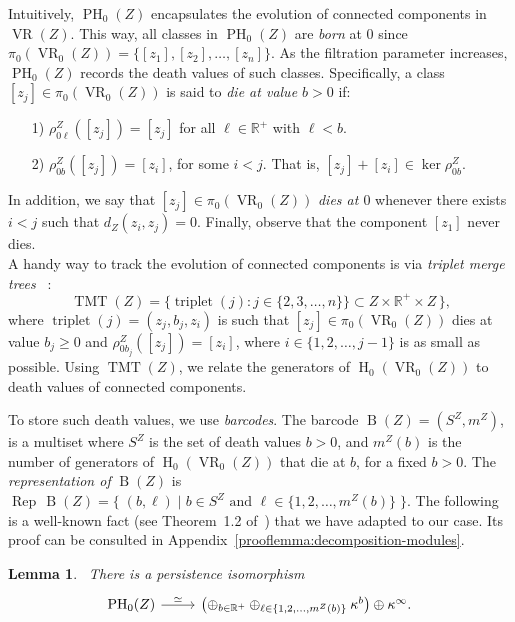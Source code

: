 \documentclass{article}
\DeclareMathOperator{\PH}{PH}
\DeclareMathOperator{\VR}{VR}
\DeclareMathOperator{\Ho}{H}
\DeclareMathOperator{\B}{B}
\DeclareMathOperator{\Rep}{Rep}
\DeclareMathOperator{\triplet}{triplet}
\DeclareMathOperator{\TMT}{TMT}
\newcommand{\R}{\mathbb{R}^+}
\newcommand{\scst}{\scriptscriptstyle}
\newcommand{\rhoZ}{\rho^{\scst Z}}
\newcommand{\dZ}{d_{\scst Z}}
\newcommand{\SZ}{S^{\scst Z}}
\newcommand{\mZ}{m^{\scst Z}}
\newcommand{\kb}{\kappa^b}
\newcommand{\kinfty}{\kappa^\infty}
\newtheorem{lemma}[theorem]{Lemma}
\begin{document}
Intuitively, $\PH_0(Z)$ encapsulates the evolution of connected components in $\VR(Z)$. 
This way,  all classes in $\PH_0(Z)$ are \emph{born} at $0$
since
$
\pi_0(\VR_0(Z))=
\big\{ [z_1],[z_2],\dots,[z_n] \big\}
$.
As the filtration parameter increases, $\PH_0(Z)$ records the death values of such classes.
Specifically, a class $[z_j]\in \pi_0(\VR_0(Z))$ is said to \textit{die at value $b>0$} 
if: 
\begin{itemize}
    \item[1)] $
\rhoZ_{0\ell}([z_j])=[z_j]$ for all $\ell\in\R$ with $\ell<b$.
\item[2)] 
$
\rhoZ_{0b}([z_j])=[z_i]
$, 
for some $i<j$.
That is, 
$[z_j]+[z_{i}]\in 
\ker\rhoZ_{0b}$.
\end{itemize}
In addition, we say that $[z_j]\in \pi_0(\VR_0(Z))$ \emph{dies at 
$0$} whenever
there exists $i<j$ such that 
$\dZ(z_i,z_j)=0$. 
Finally, observe that
the component $[z_1]$ never dies.
\\
A handy way to track the evolution of connected components is via 
\emph{triplet merge trees}
~\cite{triplets}: 
  \[\mbox{$\TMT(Z)=\big\{\triplet(j)\colon j\in\{2,3,\dots,n\}\big\} \subset Z\times \R \times Z\,\big\}$,}\]
where $\triplet(j)=(z_j, b_j, z_i)$ is
such that $[z_j]\in \pi_0(\VR_0(Z))$ dies at value $b_j\geq0$ and $\rhoZ_{0b_j}([z_j]) = [z_i]$, where $i\in\{1,2,\dots,j-1\}$ is as small as possible.
Using $\TMT(Z)$, we relate the generators of $\Ho_0(\VR_0(Z))$ to death values of connected components.

To store such death values, we use \emph{barcodes}.
The barcode $\B(Z)=(\SZ,\mZ)$, 
is a multiset where 
 $\SZ$ is the set of death values $b>0$, and $\mZ(b)$ is the number of generators of $\Ho_0(\VR_0(Z))$ that die at $b$, for a fixed $b>0$.
 The \emph{representation of}  $\B(Z)$ is
 $
\Rep\, \B(Z) = \big\{ \; (b,\ell) \;\vert\; b \in \SZ
\mbox{ and } 
\ell\in \{1,2,\dots,\mZ(b)\}\; \big\}
$.  
The following is a well-known fact
(see Theorem~1.2 of~\cite{decomposition2})
that we have adapted to our case. Its proof can be consulted in Appendix~\ref{prooflemma:decomposition-modules}.
 

\begin{lemma}~\label{lemma:decomposition-modules}
   There is a persistence isomorphism
    \[
       \begin{tikzcd}
       \PH_0(Z) 
    \ar[r, "\simeq"] & 
    \left(\oplus_{b \in \R} \oplus_{\ell \in   
    \{1,2,\dots,\mZ(b)\}} \kb\right) 
    \oplus 
    \kinfty.
    \end{tikzcd} 
   \]
\end{lemma}
\end{document}
